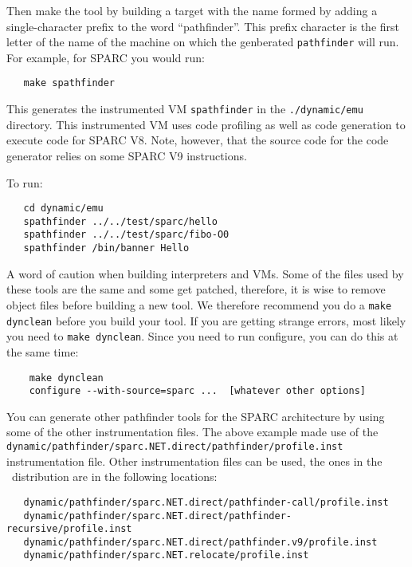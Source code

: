 {Then make the tool by building a target
with the name formed by adding a single-character prefix
to the word ``pathfinder''.
This prefix character is the first letter of the name of the machine 
on which the genberated \texttt{pathfinder} will run.  
For example, for SPARC you would run: 

\begin{verbatim}
   make spathfinder
\end{verbatim}

This generates the instrumented VM \texttt{spathfinder} in the
\texttt{./dynamic/emu} directory.
This instrumented VM uses code profiling as well as code generation
to execute code for SPARC V8.
Note, however, that the source code for the code generator
relies on some SPARC V9 instructions. 

To run: 
\begin{verbatim}
   cd dynamic/emu
   spathfinder ../../test/sparc/hello
   spathfinder ../../test/sparc/fibo-O0
   spathfinder /bin/banner Hello
\end{verbatim}

A word of caution when building interpreters and VMs.  Some of the
files used by these tools are the same and some get patched, therefore, 
it is wise to remove object files before building a new tool.  We
therefore recommend you do a \texttt{make dynclean} before you build 
your tool.  If you are getting strange errors, most likely you need 
to \texttt{make dynclean}. 
Since you need to run configure, you can do this at the same time:

\begin{verbatim}
    make dynclean
    configure --with-source=sparc ...  [whatever other options]
\end{verbatim}

You can generate other pathfinder tools for the SPARC architecture 
by using some of the other instrumentation files.  The above example 
made use of the 
\texttt{dynamic/pathfinder/sparc.NET.direct/pathfinder/profile.inst} 
instrumentation file.  
Other instrumentation files can be used, the ones in the \walk\ 
distribution are in the following locations: 

\begin{verbatim}
   dynamic/pathfinder/sparc.NET.direct/pathfinder-call/profile.inst
   dynamic/pathfinder/sparc.NET.direct/pathfinder-recursive/profile.inst
   dynamic/pathfinder/sparc.NET.direct/pathfinder.v9/profile.inst
   dynamic/pathfinder/sparc.NET.relocate/profile.inst
\end{verbatim} 


}

